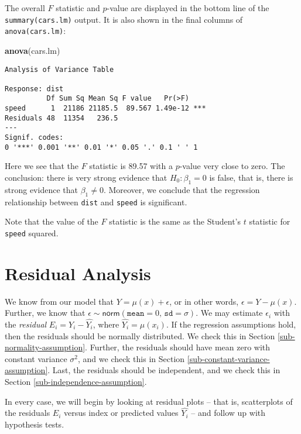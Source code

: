 \documentclass[]{book}
\newenvironment{Shaded}{\begin{snugshade}}{\end{snugshade}}
\newcommand{\KeywordTok}[1]{\textcolor[rgb]{0.13,0.29,0.53}{\textbf{{#1}}}}
\newcommand{\NormalTok}[1]{{#1}}
\numberwithin{equation}{chapter}
\numberwithin{figure}{chapter}
\theoremstyle{plain}
\theoremstyle{definition}
\theoremstyle{remark}
\theoremstyle{definition}
\theoremstyle{definition}
\theoremstyle{remark}
\begin{document}
The overall \(F\) statistic and \(p\)-value are displayed in the bottom
line of the \texttt{summary(cars.lm)} output. It is also shown in the
final columns of \texttt{anova(cars.lm)}:

\begin{Shaded}
\begin{Highlighting}[]
\KeywordTok{anova}\NormalTok{(cars.lm)}
\end{Highlighting}
\end{Shaded}

\begin{verbatim}
Analysis of Variance Table

Response: dist
          Df Sum Sq Mean Sq F value   Pr(>F)    
speed      1  21186 21185.5  89.567 1.49e-12 ***
Residuals 48  11354   236.5                     
---
Signif. codes:  
0 '***' 0.001 '**' 0.01 '*' 0.05 '.' 0.1 ' ' 1
\end{verbatim}

Here we see that the \(F\) statistic is 89.57 with a \(p\)-value very
close to zero. The conclusion: there is very strong evidence that
\(H_{0}:\beta_{1} = 0\) is false, that is, there is strong evidence that
\(\beta_{1} \neq 0\). Moreover, we conclude that the regression
relationship between \texttt{dist} and \texttt{speed} is significant.

Note that the value of the \(F\) statistic is the same as the Student's
\(t\) statistic for \texttt{speed} squared.

\section{Residual Analysis}\label{sec-residual-analysis-slr}

We know from our model that \(Y=\mu(x)+\epsilon\), or in other words,
\(\epsilon=Y-\mu(x)\). Further, we know that
\(\epsilon\sim\mathsf{norm}(\mathtt{mean}=0,\,\mathtt{sd}=\sigma)\). We
may estimate \(\epsilon_{i}\) with the \emph{residual}
\(E_{i}=Y_{i}-\hat{Y_{i}}\), where \(\hat{Y_{i}}=\hat{\mu}(x_{i})\). If
the regression assumptions hold, then the residuals should be normally
distributed. We check this in Section \ref{sub-normality-assumption}.
Further, the residuals should have mean zero with constant variance
\(\sigma^{2}\), and we check this in Section
\ref{sub-constant-variance-assumption}. Last, the residuals should be
independent, and we check this in Section
\ref{sub-independence-assumption}.

In every case, we will begin by looking at residual plots -- that is,
scatterplots of the residuals \(E_{i}\) versus index or predicted values
\(\hat{Y_{i}}\) -- and follow up with hypothesis tests.
\end{document}
